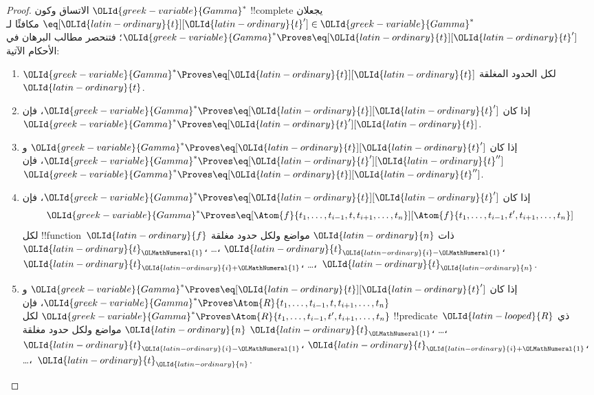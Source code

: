 \documentclass[../../../include/open-logic-section]{subfiles}
\begin{document}
\begin{proof}
الاتساق وكون ${\OLId{greek-variable}{Gamma}}^*$ !!{complete} يجعلان $\eq[{\OLId{latin-ordinary}{t}}][{\OLId{latin-ordinary}{t}}'] \in
{\OLId{greek-variable}{Gamma}}^*$ مكافئًا لـ${\OLId{greek-variable}{Gamma}}^* \Proves \eq[{\OLId{latin-ordinary}{t}}][{\OLId{latin-ordinary}{t}}']$؛ فتنحصر مطالب
البرهان في الأحكام الآتية:
\begin{enumerate}
\item ${\OLId{greek-variable}{Gamma}}^* \Proves \eq[{\OLId{latin-ordinary}{t}}][{\OLId{latin-ordinary}{t}}]$ لكل الحدود المغلقة~${\OLId{latin-ordinary}{t}}$.
\item إذا كان ${\OLId{greek-variable}{Gamma}}^* \Proves \eq[{\OLId{latin-ordinary}{t}}][{\OLId{latin-ordinary}{t}}']$، فإن
  ${\OLId{greek-variable}{Gamma}}^* \Proves \eq[{\OLId{latin-ordinary}{t}}'][{\OLId{latin-ordinary}{t}}]$.
\item إذا كان ${\OLId{greek-variable}{Gamma}}^* \Proves \eq[{\OLId{latin-ordinary}{t}}][{\OLId{latin-ordinary}{t}}']$ و${\OLId{greek-variable}{Gamma}}^* \Proves
  \eq[{\OLId{latin-ordinary}{t}}'][{\OLId{latin-ordinary}{t}}'']$، فإن ${\OLId{greek-variable}{Gamma}}^* \Proves \eq[{\OLId{latin-ordinary}{t}}][{\OLId{latin-ordinary}{t}}'']$.
\item إذا كان ${\OLId{greek-variable}{Gamma}}^* \Proves \eq[{\OLId{latin-ordinary}{t}}][{\OLId{latin-ordinary}{t}}']$، فإن
\[
{\OLId{greek-variable}{Gamma}}^* \Proves
\eq[\Atom{f}{t_1,\dots,t_{i-1},t,t_{i+1},\dots,t_n}][\Atom{f}{t_1,\dots,t_{i-1},t',t_{i+1},\dots,t_n}]
\]
لكل !!{function}~${\OLId{latin-ordinary}{f}}$ ذات ${\OLId{latin-ordinary}{n}}$ مواضع ولكل حدود مغلقة ${\OLId{latin-ordinary}{t}}_{\OLMathNumeral{1}}$، \dots،
${\OLId{latin-ordinary}{t}}_{{\OLId{latin-ordinary}{i}}-{\OLMathNumeral{1}}}$، ${\OLId{latin-ordinary}{t}}_{{\OLId{latin-ordinary}{i}}+{\OLMathNumeral{1}}}$، \dots،~${\OLId{latin-ordinary}{t}}_{\OLId{latin-ordinary}{n}}$.
\item إذا كان ${\OLId{greek-variable}{Gamma}}^* \Proves \eq[{\OLId{latin-ordinary}{t}}][{\OLId{latin-ordinary}{t}}']$ و
${\OLId{greek-variable}{Gamma}}^* \Proves
\Atom{R}{t_1,\dots,t_{i-1},t,t_{i+1},\dots,t_n}$، فإن
${\OLId{greek-variable}{Gamma}}^* \Proves \Atom{R}{t_1,\dots,t_{i-1},t',t_{i+1},\dots,t_n}$
لكل !!{predicate}~${\OLId{latin-looped}{R}}$ ذي ${\OLId{latin-ordinary}{n}}$ مواضع ولكل حدود مغلقة ${\OLId{latin-ordinary}{t}}_{\OLMathNumeral{1}}$، \dots،
${\OLId{latin-ordinary}{t}}_{{\OLId{latin-ordinary}{i}}-{\OLMathNumeral{1}}}$، ${\OLId{latin-ordinary}{t}}_{{\OLId{latin-ordinary}{i}}+{\OLMathNumeral{1}}}$، \dots،~${\OLId{latin-ordinary}{t}}_{\OLId{latin-ordinary}{n}}$.
\end{enumerate}
\end{proof}
\end{document}
